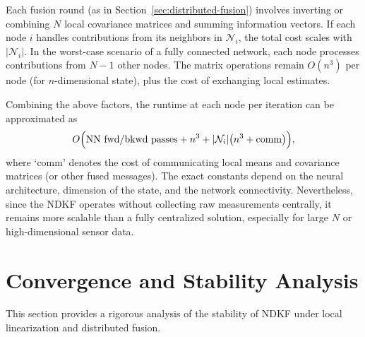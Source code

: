\documentclass[letterpaper, 10 pt, conference]{ieeeconf}
\begin{document}
Each fusion round (as in Section~\ref{sec:distributed-fusion}) involves inverting or combining $N$ local covariance matrices and summing information vectors. If each node $i$ handles contributions from its neighbors in $\mathcal{N}_i$, the total cost scales with $|\mathcal{N}_i|$. In the worst-case scenario of a fully connected network, each node processes contributions from $N-1$ other nodes. The matrix operations remain $O(n^3)$ per node (for $n$-dimensional state), plus the cost of exchanging local estimates.

Combining the above factors, the runtime at each node per iteration can be approximated as
\begin{equation}
    O\Bigl(\text{NN fwd/bkwd passes} + n^3 + |\mathcal{N}_i|\bigl(n^3 + \text{comm}\bigr)\Bigr),
\end{equation}
where `$\text{comm}$' denotes the cost of communicating local means and covariance matrices (or other fused messages). The exact constants depend on the neural architecture, dimension of the state, and the network connectivity. Nevertheless, since the NDKF operates without collecting raw measurements centrally, it remains more scalable than a fully centralized solution, especially for large $N$ or high-dimensional sensor data.

\section{Convergence and Stability Analysis}
\label{sec:convergence-stability}

This section provides a rigorous analysis of the stability of NDKF under local linearization and distributed fusion.
\end{document}
